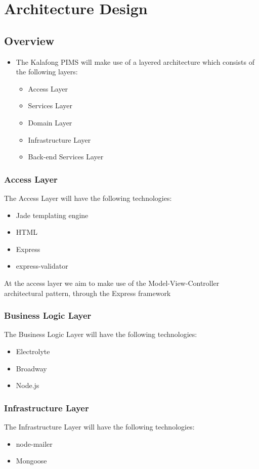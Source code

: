 \documentclass[a4paper,12pt,titlepage]{article}
\begin{document}
\section{Architecture Design}
\subsection{Overview}
\begin{itemize}
	\item The Kalafong PIMS will make use of a layered architecture which consists of the following layers: 
		\begin{itemize}
			\item Access Layer 
			\item Services Layer
			\item Domain Layer
			\item Infrastructure Layer				
			\item Back-end Services Layer
		\end{itemize}
\end{itemize}

\subsubsection{Access Layer}
The Access Layer will have the following technologies:
\begin{itemize}
	\item Jade templating engine
	\item HTML
	\item Express
	\item express-validator				
\end{itemize}
At the access layer we aim to make use of the Model-View-Controller architectural pattern, through the Express framework
\subsubsection{Business Logic Layer}
The Business Logic Layer will have the following technologies:
\begin{itemize}
	\item Electrolyte
	\item Broadway
	\item Node.js 
\end{itemize}

\subsubsection{Infrastructure Layer}
The Infrastructure Layer will have the following technologies:
\begin{itemize}
	\item node-mailer
	\item Mongoose
\end{itemize}
\end{document}
